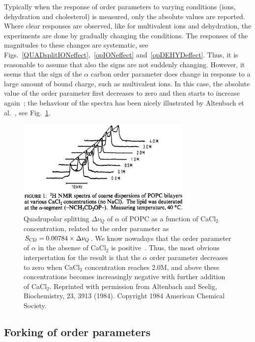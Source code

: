 \documentclass[aps,prl,superscriptaddress,twocolumn]{revtex4}
\begin{document}
Typically when the response of order parameters to varying conditions (ions, dehydration and cholesterol) is measured, only the absolute 
values are reported. Where clear responses are observed, like for multivalent ions and dehydration, the experiments are done by gradually 
changing the conditions. The responses of the magnitudes to these changes are systematic, see Figs.~\ref{QUADsplitIONeffect},~\ref{opIONeffect}
and~\ref{opDEHYDeffect}. Thus, it is reasonable to assume that also the signs are not suddenly changing. However, it seems that the sign of 
the $\alpha$ carbon order parameter does change in response to a large amount of bound charge, such as multivalent ions. In this case, 
the absolute value of the order parameter first decreases to zero and then starts to increase again~\cite{altenbach84,seelig87}; 
the behaviour of the spectra has been nicely illustrated by Altenbach et al.~\cite{altenbach84}, see Fig.~\ref{qsCACLeffect}.
\begin{figure}[]
  \includegraphics[width=8.6cm]{../Fig/QUADsplitCACLeffect.eps}
\newline
  \caption{\label{qsCACLeffect}
    Quadrupolar splitting $\Delta \nu_Q$ of $\alpha$ of POPC as a function of CaCl$_2$ concentration, related to the order parameter as $S_{{\rm CD}}=0.00784 \times \Delta \nu_Q$. 
    We know nowadays that the order parameter of $\alpha$ in the absense of CaCl$_2$ is positive~\cite{hong95a,hong95b,gross97}.
    Thus, the most obvious interpertation for the result is that the $\alpha$ order parameter decreases to zero when CaCl$_2$ concentration reaches 2.0M, and 
    above these concentrations becomes increasingly negative with further addition of CaCl$_2$. Reprinted with permission from Altenbach and Seelig, Biochemistry, 23, 3913 (1984). Copyright 1984 American Chemical Society.    
  } 
\end{figure}



\subsection{Forking of order parameters}
\end{document}
